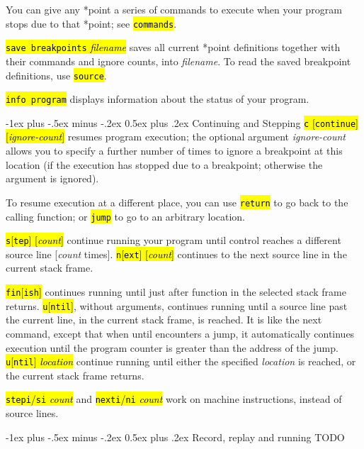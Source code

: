 \documentclass[a4paper,landscape]{article}
\makeatletter
\renewcommand{\section}{\@startsection{section}{1}{0mm}%
                                {-1ex plus -.5ex minus -.2ex}%
                                {0.5ex plus .2ex}%
                                {\normalfont\large\bfseries}}
\makeatother
\begin{document}
\begin{multicols*}{3}
You can give any *point a series of commands to execute
when your program stops due to that *point; see \hl{\texttt{commands}}.

\hl{\texttt{save breakpoints} \textit{filename}} saves all current *point definitions together with their commands and ignore counts, into \textit{filename}.
To read the saved breakpoint definitions, use \hl{\texttt{source}}.

\hl{\texttt{info program}} displays information about the status of your program.

\section{Continuing and Stepping}
\hl{\texttt{c} [\texttt{continue}] [\textit{ignore-count}]}
resumes program execution; the optional argument
\textit{ignore-count} allows you to specify a further number of times to ignore a breakpoint at this location (if the execution has stopped due to a breakpoint; otherwise the argument is ignored).

To resume execution at a different place, you can use \hl{\texttt{return}} to go back to the
calling function; or \hl{\texttt{jump}} to go to an arbitrary location.

\hl{\texttt{s}[\texttt{tep}] [\textit{count}]} continue running your program until control reaches a different source line [\textit{count} times]. \hl{\texttt{n}[\texttt{ext}] [\textit{count}]} continues to the next source line in the current stack frame.

\hl{\texttt{fin}[\texttt{ish}]} continues running until just after function in the selected stack frame returns.
\hl{\texttt{u}[\texttt{ntil}]}, without arguments, continues running until a source line past the current line, in the current stack frame, is reached. It is like the next command, except that when until encounters a jump, it automatically continues execution until the program counter is greater than the address of the jump. \hl{\texttt{u}[\texttt{ntil}] \textit{location}} continue running until either the specified \textit{location} is reached, or the current stack frame returns.

\hl{\texttt{stepi}/\texttt{si} \textit{count}} and \hl{\texttt{nexti}/\texttt{ni} \textit{count}} work on machine instructions, instead of source lines.

\section{Record, replay and running}
TODO


\end{multicols*}
\end{document}
